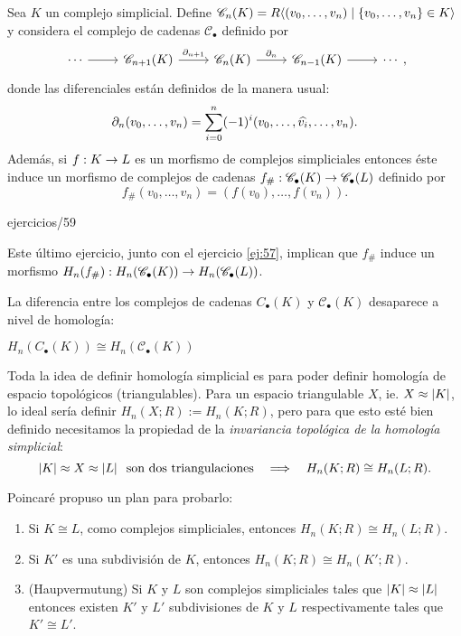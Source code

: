 \documentclass[../../topologia_algebraica]{subfiles}
\begin{document}
\begin{defin}
	Sea $K$ un complejo simplicial. Define $\mathscr{C}_n(K)=R\langle (v_0,\ldots,v_n)\mid\{v_0,\ldots,v_n\}\in K \rangle$ y
	considera el complejo de cadenas $\mathscr{C}_{\bullet}$ definido por
	\[
		\begin{tikzcd}
			\cdots \arrow[r] & \mathscr{C}_{n+1}(K) \arrow[r,"\partial_{n+1}"] & \mathscr{C}_n(K) \arrow[r,"\partial_n"] & \mathscr{C}_{n-1}(K) \arrow[r] & \cdots
		\end{tikzcd},
	\]
	donde las diferenciales est\'an definidos de la manera usual:
	\[
		\partial_n(v_0,\ldots,v_n)=\sum_{i=0}^n (-1)^i (v_0,\ldots,\widehat{ v_i },\ldots,v_n).
	\]
	Adem\'as, si $f:K\rightarrow L$ es un morfismo de complejos simpliciales entonces \'este induce un morfismo de
	complejos de cadenas $f_{\#}:\mathscr{C}_{\bullet}(K)\rightarrow\mathscr{C}_{\bullet}(L)$ definido por
	\[
		f_{\#}(v_0,\ldots,v_n)=(f(v_0),\ldots,f(v_n)).
	\]
\end{defin}

{ejercicios/59} %

\begin{nota}
	Este \'ultimo ejercicio, junto con el ejercicio \ref{ej:57}, implican que $f_{\#}$ induce un morfismo
	$H_n(f_{\#}):H_n(\mathscr{C}_{\bullet}(K))\rightarrow H_n(\mathscr{C}_{\bullet}(L))$.
\end{nota}

La diferencia entre los complejos de cadenas $C_{\bullet}(K)$ y $\mathscr{C}_{\bullet}(K)$ desaparece a nivel de
homolog\'ia:

\begin{prop}\label{prop:homologias_coinciden_cadenas}
	$H_n(C_{\bullet}(K))\cong H_n(\mathscr{C}_{\bullet}(K))$
\end{prop}

Toda la idea de definir homolog\'ia simplicial es para poder definir homolog\'ia de espacio topol\'ogicos (triangulables).
Para un espacio triangulable $X$, ie. $X\approx\left| K \right|$, lo ideal ser\'ia definir $H_n(X;R):=H_n(K;R)$, pero para que
esto est\'e bien definido necesitamos la propiedad de la \emph{invariancia topol\'ogica de la homolog\'ia simplicial}:
\[
	\left| K \right|\approx X \approx\left| L \right|\;\;\text{son dos triangulaciones} \quad\Longrightarrow\quad H_n(K;R)\cong H_n(L;R).
\]

Poincar\'e propuso un plan para probarlo:

\begin{enumerate}
	\item Si $K\cong L$, como complejos simpliciales, entonces $H_n(K;R)\cong H_n(L;R)$.
	\item Si $K'$ es una subdivisi\'on de $K$,  entonces $H_n(K;R)\cong H_n(K';R)$.
	\item(Haupvermutung) Si $K$ y $L$ son complejos simpliciales tales que $\left| K \right|\approx\left| L \right|$ entonces existen
		$K'$ y $L'$ subdivisiones de $K$ y $L$ respectivamente tales que $K'\cong L'$.
\end{enumerate}
\end{document}
